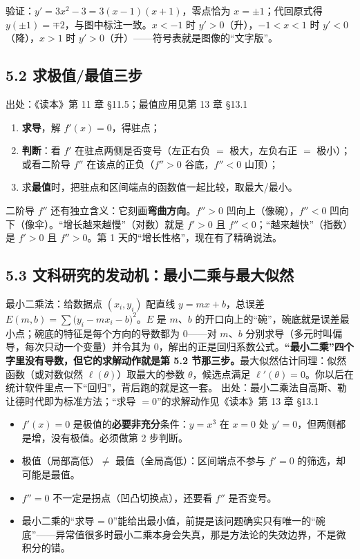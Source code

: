 \documentclass[UTF8,a4paper,11pt]{ctexart}
\newcommand{\src}[1]{%
  {\small\colorbox{refbg}{\color{refaccent}出处：#1}}}
\begin{document}
验证：$y'=3x^2-3=3(x-1)(x+1)$，零点恰为 $x=\pm1$；代回原式得 $y(\pm1)=\mp2$，与图中标注一致。$x<-1$ 时 $y'>0$（升），$-1<x<1$ 时 $y'<0$（降），$x>1$ 时 $y'>0$（升）——符号表就是图像的“文字版”。

\subsection*{5.2 求极值/最值三步}\src{《读本》第 11 章 §11.5；最值应用见第 13 章 §13.1}

\begin{enumerate}
  \item \textbf{求导}，解 $f'(x)=0$，得驻点；
  \item \textbf{判断}：看 $f'$ 在驻点两侧是否变号（左正右负 $=$ 极大，左负右正 $=$ 极小）；或看二阶导 $f''$ 在该点的正负（$f''>0$ 谷底，$f''<0$ 山顶）；
  \item 求\textbf{最值}时，把驻点和区间端点的函数值一起比较，取最大/最小。
\end{enumerate}

二阶导 $f''$ 还有独立含义：它刻画\textbf{弯曲方向}。$f''>0$ 凹向上（像碗），$f''<0$ 凹向下（像伞）。“增长越来越慢”（对数）就是 $f'>0$ 且 $f''<0$；“越来越快”（指数）是 $f'>0$ 且 $f''>0$。第 1 天的“增长性格”，现在有了精确说法。

\subsection*{5.3 文科研究的发动机：最小二乘与最大似然}

\begin{keyconcept}[为什么回归和估计都在“求导 = 0”？]
最小二乘法：给数据点 $(x_i,y_i)$ 配直线 $y=mx+b$，总误差 $E(m,b)=\sum\bigl(y_i-mx_i-b\bigr)^2$。$E$ 是 $m$、$b$ 的开口向上的“碗”，碗底就是误差最小点；碗底的特征是每个方向的导数都为 $0$——对 $m$、$b$ 分别求导（多元时叫偏导，每次只动一个变量）并令其为 $0$，解出的正是回归系数公式。\textbf{“最小二乘”四个字里没有导数，但它的求解动作就是第 5.2 节那三步。}最大似然估计同理：似然函数（或对数似然 $\ell(\theta)$）取最大的参数 $\theta$，候选点满足 $\ell'(\theta)=0$。你以后在统计软件里点一下“回归”，背后跑的就是这一套。\src{最小二乘法自高斯、勒让德时代即为标准方法；“求导 $=0$”的求解动作见《读本》第 13 章 §13.1}
\end{keyconcept}

\begin{calcbox}[易错点与失效边界]
\begin{itemize}
  \item $f'(x)=0$ 是极值的\textbf{必要非充分}条件：$y=x^3$ 在 $x=0$ 处 $y'=0$，但两侧都是增，没有极值。必须做第 2 步判断。
  \item 极值（局部高低）$\neq$ 最值（全局高低）：区间端点不参与 $f'=0$ 的筛选，却可能是最值。
  \item $f''=0$ 不一定是拐点（凹凸切换点），还要看 $f''$ 是否变号。
  \item 最小二乘的“求导 = 0”能给出最小值，前提是该问题确实只有唯一的“碗底”——异常值很多时最小二乘本身会失真，那是方法论的失效边界，不是微积分的错。
\end{itemize}
\end{calcbox}
\end{document}
